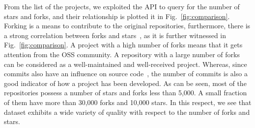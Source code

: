  


From the list of the projects, we exploited the \GH API to query for the number of stars and forks, and their relationship is plotted it in Fig.~\ref{fig:comparison}. %
Forking is a means to contribute to the original repositories, %
furthermore, there is a strong correlation between forks and stars~\cite{7816479}, as it is further witnessed in Fig.~\ref{fig:comparison}. A project with a high number of forks means that it gets attention from the OSS community. A repository with a large number of forks can be considered as a well-maintained and well-received project. Whereas, since commits also have an influence on source code~\cite{8009930}, the number of commits is also a good indicator of how a project has been developed. As can be seen, most of the repositories possess a number of stars and forks less than 5,000. A small fraction of them have more than 30,000 forks and 10,000 stars. In this respect, we see that dataset exhibits a wide variety of quality with respect to the number of forks and stars.









